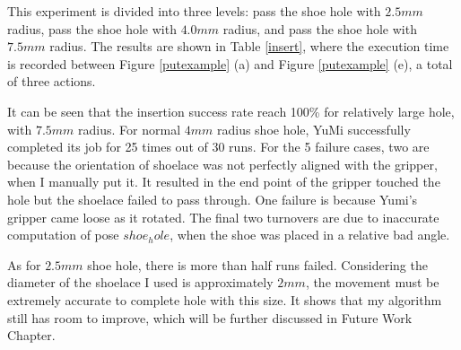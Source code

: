 This experiment is divided into three levels: pass the shoe hole with $2.5mm$ radius, pass the shoe hole with $4.0mm$ radius, and pass the shoe hole with $7.5mm$ radius. The results are shown in Table \ref{insert}, where the execution time is recorded between Figure \ref{putexample} (a) and Figure \ref{putexample} (e), a total of three actions. 

\begin{table}[H]
\centering
{}
\caption{The testing results of shoelace insertion}
\label{insert}
\end{table}

It can be seen that the insertion success rate reach 100\% for relatively large hole, with $7.5mm$ radius. For normal $4mm$ radius shoe hole, YuMi successfully completed its job for 25 times out of 30 runs. For the 5 failure cases, two are because the orientation of shoelace was not perfectly aligned with the gripper, when I manually put it. It resulted in the end point of the gripper touched the hole but the shoelace failed to pass through. One failure is because Yumi's gripper came loose as it rotated. The final two turnovers are due to inaccurate computation of pose $shoe_hole$, when the shoe was placed in a relative bad angle.

As for $2.5mm$ shoe hole, there is more than half runs failed. Considering the diameter of the shoelace I used is approximately $2mm$, the movement must be extremely accurate to complete hole with this size. It shows that my algorithm still has room to improve, which will be further discussed in Future Work Chapter.

